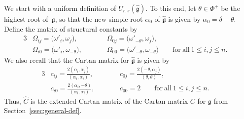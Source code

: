 \documentclass[10pt,a4paper]{amsart}
\numberwithin{equation}{section}
\newcommand{\fg}{\mathfrak{g}}
\newcommand{\wfg}{\widehat{\mathfrak{g}}}
\newcommand{\UU}{U_{r,s}(\widehat{\fg})}
\begin{document}
We start with a uniform definition of $\UU$. To this end, let $\theta\in \Phi^+$ be the highest root of~$\fg$, so that the new simple root $\alpha_0$ of $\wfg$ is given by $\alpha_0=\delta-\theta$. Define the matrix of structural constants  by
\begin{alignat*}{3}
 &\Omega_{ij}=\bigl(\omega'_i,\omega_j\bigr), \qquad&& \Omega_{0j}=\bigl(\omega'_{-\theta},\omega_j\bigr), & \\
 &\Omega_{i0}=\bigl(\omega'_i, \omega_{-\theta}\bigr), \qquad&& \Omega_{00}=\bigl(\omega'_{-\theta},\omega_{-\theta}\bigr)
 \qquad \mathrm{for\ all} \ 1\leq i,j\leq n.&
\end{alignat*}
We also recall that the Cartan matrix  for $\wfg$ is given by
\begin{alignat*}{3}
 &c_{ij}=\frac{2(\alpha_{i},\alpha_{j})}{(\alpha_{i},\alpha_{i})}, \qquad&&
 c_{0j} = \frac{2(-\theta,\alpha_{j})}{(\theta,\theta)}, &\\
 &c_{i0} = \frac{2(\alpha_{i},-\theta)}{(\alpha_{i},\alpha_{i})}, \qquad&&
 c_{00}=2 \qquad \mathrm{for\ all} \ 1\leq i,j\leq n.&
\end{alignat*}
Thus, $\hat{C}$ is the extended Cartan matrix of the Cartan matrix $C$ for $\fg$ from Section~\ref{ssec:general-def}.
\end{document}
